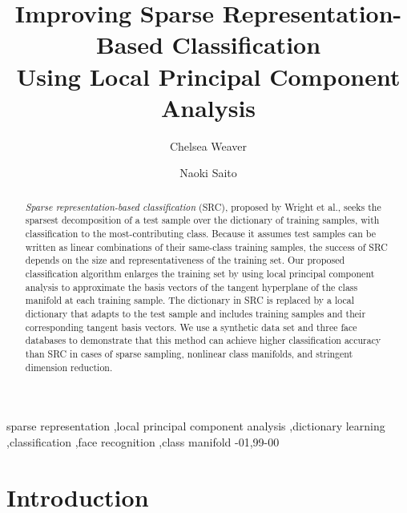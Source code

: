 \documentclass[review]{elsarticle}
\begin{document}
\theoremstyle{remark}
\newtheorem{rem}{Remark}


\begin{frontmatter}

\title{Improving Sparse Representation-Based Classification\\
 Using Local Principal Component Analysis}


\author{Chelsea Weaver}

\author{Naoki Saito}

\address{Department of Mathematics\\
University of California, Davis \\
One Shields Avenue\\
Davis, California, 95616, United States}


\begin{abstract}
\emph{Sparse representation-based classification} (SRC), proposed by Wright et al., seeks the sparsest decomposition of a test sample over the dictionary of training samples, with classification to the most-contributing class. Because it assumes test samples can be written as linear combinations of their same-class training samples, the success of SRC depends on the size and representativeness of the training set. Our proposed classification algorithm enlarges the training set by using local principal component analysis to approximate the basis vectors of the tangent hyperplane of the class manifold at each training sample. The dictionary in SRC is replaced by a local dictionary that adapts to the test sample and includes training samples and their corresponding tangent basis vectors. We use a synthetic data set and three face databases to demonstrate that this method can achieve higher classification accuracy than SRC in cases of sparse sampling, nonlinear class manifolds, and stringent dimension reduction. 
\end{abstract}


\begin{keyword}
sparse representation \sep local principal component analysis \sep dictionary learning \sep classification \sep face recognition \sep class manifold 
-01\sep  99-00
\end{keyword}

\end{frontmatter}


\section{Introduction}
\end{document}
